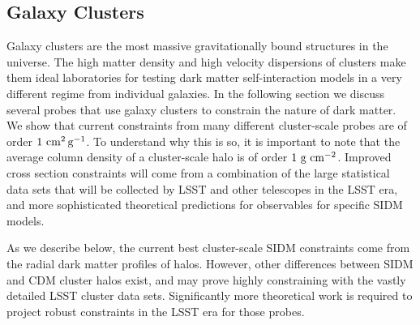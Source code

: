 \subsection{Galaxy Clusters }
\label{sec:halo_profile_clusters}


Galaxy clusters are the most massive gravitationally bound structures in the universe. The high matter density and high velocity dispersions of clusters make them ideal laboratories for testing dark matter self-interaction models in a very different regime from individual galaxies.
In the following section we discuss several probes that use galaxy clusters to constrain the nature of dark matter.  We show that current constraints from many different cluster-scale probes are of order $1\mathrm{\,\mathrm{\,cm}^2\mathrm{\,g}^{-1}}$.  To understand why this is so, it is important to note that the average column density of a cluster-scale halo is of order $1\hbox{ g cm}^{-2}$.  Improved cross section constraints will come from a combination of the large statistical data sets that will be collected by LSST and other telescopes in the LSST era, and more sophisticated theoretical predictions for observables for specific SIDM models.

\vspace{1em} 


As we describe below, the current best cluster-scale SIDM constraints come from the radial dark matter profiles of halos.  However, other differences between SIDM and CDM cluster halos exist, and may prove highly constraining with the vastly detailed LSST cluster data sets.  Significantly more theoretical work is required to project robust constraints in the LSST era for those probes.

